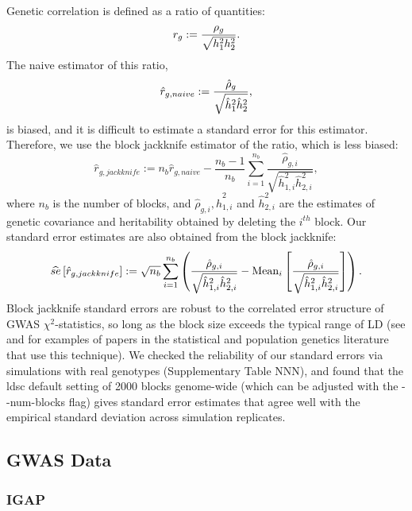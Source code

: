 \documentclass[11pt]{article}
\begin{document}
Genetic correlation is defined as a ratio of quantities: 
$$r_g := \frac{\rho_g}{\sqrt{h_{1}^2h_{2}^2}}.$$
The naive estimator of this ratio, 
$$\hat{r}_{g,naive} := \frac{\hat{\rho}_g }{ \sqrt{\hat{h}^2_1\hat{h}^2_2}},$$
is biased, and it is difficult to estimate a standard error for this estimator. 
Therefore, we use the block jackknife estimator of the ratio,
which is less biased:
$$
\hat{r}_{g,jackknife} := 
n_b\hat{r}_{g,naive} -
 \frac{n_b-1}{n_b}
 \sum_{i=1}^{n_b}
 	\frac{\hat{\rho}_{g,i} }
		{ \sqrt{\hat{h}^2_{1,i}\hat{h}^2_{2,i}}},
$$
where $n_b$ is the number of blocks, and $\hat{\rho}_{g,i}, \hat{h}^2_{1,i}$ and $\hat{h}^2_{2,i}$
are the estimates of genetic covariance and heritability obtained by deleting the $i^{th}$ block.
Our standard error estimates are also obtained from the block jackknife:
$$
\widehat{se}\left[\hat{r}_{g,jackknife}\right] := 
\sqrt{n_b} \sum_{i=1}^{n_b} \left(
 	\frac{\hat{\rho}_{g,i} }
		{ \sqrt{\hat{h}^2_{1,i}\hat{h}^2_{2,i}}} - \mathrm{Mean}_i\left[
			\frac{\hat{\rho}_{g,i} }
			{ \sqrt{\hat{h}^2_{1,i}\hat{h}^2_{2,i}}}\right]
	\right).
$$
Block jackknife standard errors are robust to the  correlated error structure 
of GWAS $\chi^2$-statistics, 
so long as the block size exceeds the typical range of LD
(see \cite{buliksullivan2014} and \cite{moorjani2011history} 
for examples of papers in the statistical and population genetics literature that use this technique). 
We checked the reliability of our standard errors via simulations with real genotypes
(Supplementary Table NNN),
and found that the ldsc default setting  of 2000 blocks genome-wide
(which can be adjusted with the {-}{-}num-blocks flag) gives standard error estimates
that agree well with the empirical standard deviation across simulation replicates.


\subsection{GWAS Data}


\subsubsection{IGAP}
\end{document}
